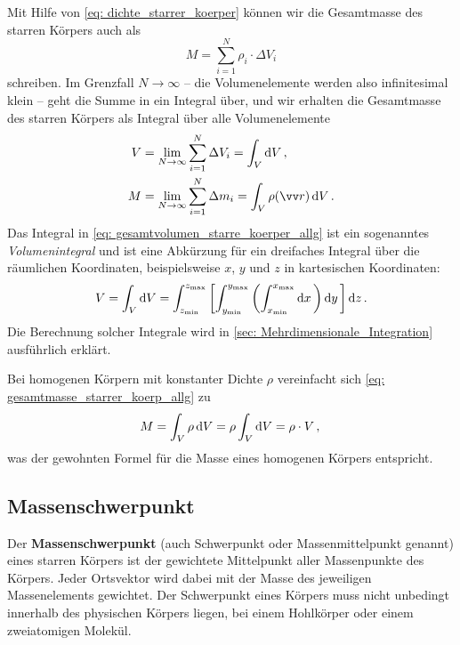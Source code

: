 Mit Hilfe von \cref{eq: dichte_starrer_koerper} können wir die Gesamtmasse des starren Körpers auch als 
\begin{equation}
    M = \sum_{i=1}^{N} \rho_i \cdot \Delta V_i 
\end{equation}
schreiben. Im Grenzfall $N \to \infty$ -- die Volumenelemente werden also infinitesimal klein -- geht die Summe in ein Integral über, und wir erhalten die Gesamtmasse des starren Körpers als Integral über alle Volumenelemente
\begin{align}
    V &= \lim_{N \to \infty} \sum_{i=1}^{N} \Delta V_i = \int_V \dd V \mComma \label{eq: gesamtvolumen_starre_koerper_allg} \\
    M &= \lim_{N \to \infty} \sum_{i=1}^{N} \Delta m_i = \int_V \rho(\ivec{r}) \,\dd V \mDot \label{eq: gesamtmasse_starrer_koerp_allg}
\end{align}
Das Integral in \cref{eq: gesamtvolumen_starre_koerper_allg} ist ein sogenanntes \textit{Volumenintegral} und ist eine Abkürzung für ein dreifaches Integral über die räumlichen Koordinaten, beispielsweise $x$, $y$ und $z$ in kartesischen Koordinaten: 
\begin{equation}\label{eq: volumenintegral_3fach}
    V = \int_V \mathrm{d} V = \int_{z_{\min}}^{z_{\max}} \left[ \int_{y_{\min}}^{y_{\max}} \left( \int_{x_{\min}}^{x_{\max}} \mathrm{d} x \, \right) \mathrm{d} y \, \right] \mathrm{d} z \,.
\end{equation}
Die Berechnung solcher Integrale wird in \cref{sec: Mehrdimensionale_Integration} ausführlich erklärt.

Bei homogenen Körpern mit konstanter Dichte $\rho$ vereinfacht sich \cref{eq: gesamtmasse_starrer_koerp_allg} zu
\begin{equation}\label{eq: gesamtmasse_starrer_koerp_homogen}
    M = \int_V \rho \, \mathrm{d} V = \rho \int_V \mathrm{d} V = \rho \cdot V \,{,}\,
\end{equation}
was der gewohnten Formel für die Masse eines homogenen Körpers entspricht.

\subsection{Massenschwerpunkt}\label{subsec: massenschwerpunkt}
Der \textbf{Massenschwerpunkt} (auch Schwerpunkt oder Massenmittelpunkt genannt) eines starren Körpers ist der gewichtete Mittelpunkt aller Massenpunkte des Körpers. Jeder Ortsvektor wird dabei mit der Masse des jeweiligen Massenelements gewichtet. Der Schwerpunkt eines Körpers muss nicht unbedingt innerhalb des physischen Körpers liegen, \zB bei einem Hohlkörper oder einem zweiatomigen Molekül.

